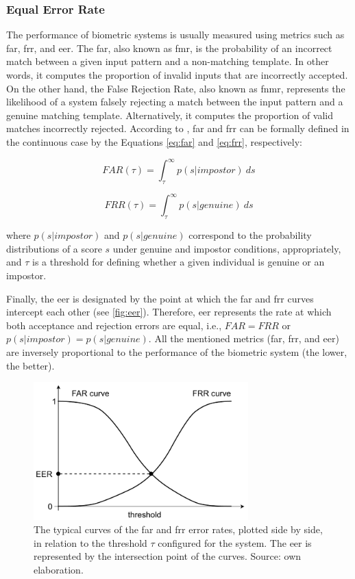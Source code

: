 \subsubsection{Equal Error Rate}

The performance of biometric systems is usually measured using metrics such as \acf{far}, \acf{frr}, and \acf{eer}. The \acl{far}, also known as \acf{fmr}, is the probability of an incorrect match between a given input pattern and a non-matching template. In other words, it computes the proportion of invalid inputs that are incorrectly accepted. On the other hand, the False Rejection Rate, also known as \acf{fnmr}, represents the likelihood of a system falsely rejecting a match between the input pattern and a genuine matching template. Alternatively, it computes the proportion of valid matches incorrectly rejected. According to \cite{ross2006handbook}, \acs{far} and \acs{frr} can be formally defined in the continuous case by the Equations \ref{eq:far} and \ref{eq:frr}, respectively:

\begin{equation}
\label{eq:far}
FAR(\tau) = \int_{\tau}^{\infty} p(s|impostor)\ ds
\end{equation}

\begin{equation}
\label{eq:frr}
FRR(\tau) = \int_{\tau}^{\infty} p(s|genuine)\ ds
\end{equation}

\noindent
where $p(s|impostor)$ and $p(s|genuine)$ correspond to the probability distributions of a score $s$ under genuine and impostor conditions, appropriately, and $\tau$ is a threshold for defining whether a given individual is genuine or an impostor.

Finally, the \acs{eer} is designated by the point at which the \acs{far} and \acs{frr} curves intercept each other (see \autoref{fig:eer}). Therefore, \acs{eer} represents the rate at which both acceptance and rejection errors are equal, i.e., $FAR = FRR$ or $p(s|impostor) = p(s|genuine)$. All the mentioned metrics (\acs{far}, \acs{frr}, and \acs{eer}) are inversely proportional to the performance of the biometric system (the lower, the better).

\begin{figure}[tb]
\centering
\includegraphics[height=2.1in]{images/metrics/EER.pdf}
\caption{The typical curves of the \acs{far} and \acs{frr} error rates, plotted side by side, in relation to the threshold $\tau$ configured for the system. The \acs{eer} is represented by the intersection point of the curves. Source: own elaboration.}
\label{fig:eer}
\end{figure}

